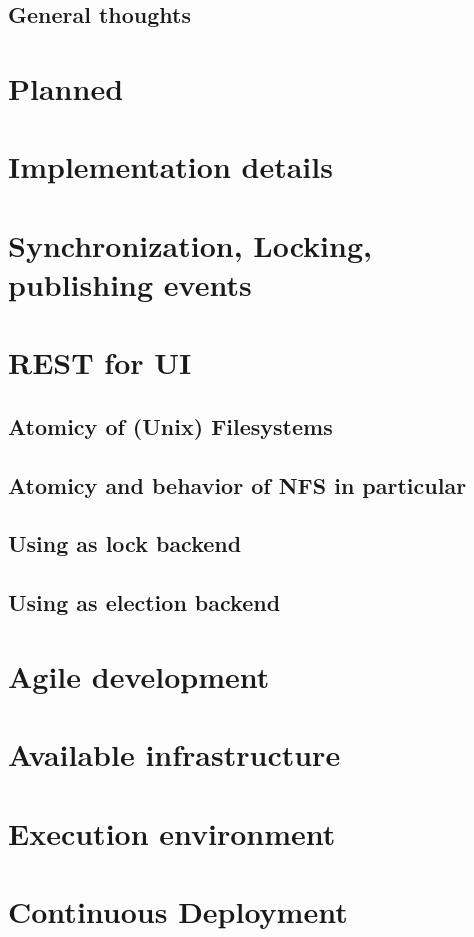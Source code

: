 \subsection{General thoughts}

\section{Planned}

\section{Implementation details}

\section{Synchronization, Locking, publishing events}

\section{REST for UI}



\subsection{Atomicy of (Unix) Filesystems}

\subsection{Atomicy and behavior of NFS in particular}

\subsection{Using as lock backend}

\subsection{Using as election backend}




\section{Agile development}

\section{Available infrastructure}

\section{Execution environment}

\section{Continuous Deployment}
